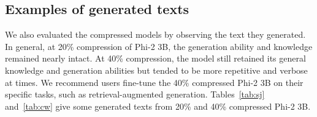\begin{table}[h!]
    \centering
    \caption{\textbf{Comparison of our method with SliceGPT on zero-shot task evaluation for Phi-2 3B.} We give the evaluation scores before compression (0\%), both as reported by SliceGPT and as reproduced by us. Both methods use the Alpaca calibration dataset for compression.}
    \label{tab:comparisons}
\end{table}

\subsection{Examples of generated texts}
We also evaluated the compressed models by observing the text they generated. In general, at 20\% compression of Phi-2 3B, the generation ability and knowledge remained nearly intact. At 40\% compression, the model still retained its general knowledge and generation abilities but tended to be more repetitive and verbose at times. We recommend users fine-tune the 40\% compressed Phi-2 3B on their specific tasks, such as retrieval-augmented generation. Tables~\ref{tab:sj} and~\ref{tab:cw} give some generated texts from 20\% and 40\% compressed Phi-2 3B.

